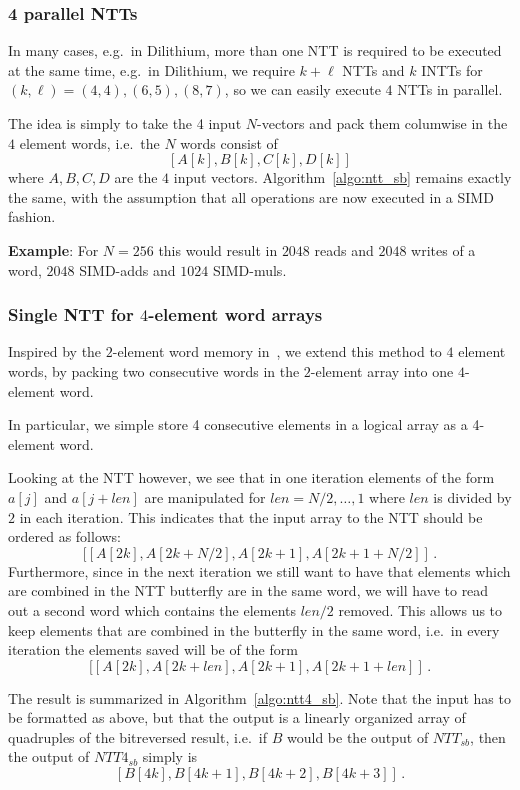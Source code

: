 \subsubsection{4 parallel NTTs}

In many cases, e.g.\ in Dilithium, more than one NTT is required to be executed at the same time, e.g.\
in Dilithium, we require $k + \ell$ NTTs and $k$ INTTs for $(k,\ell) = (4,4), (6,5), (8,7)$, so we can 
easily execute $4$ NTTs in parallel.

The idea is simply to take the 4 input $N$-vectors and pack them columwise in the $4$ element words, i.e.\
the $N$ words consist of 
\[ [A[k], B[k], C[k], D[k]] \]
where $A,B,C,D$ are the $4$ input vectors.    Algorithm~\ref{algo:ntt_sb} remains exactly the same, with the assumption that
all operations are now executed in a SIMD fashion.

\textbf{Example}: For $N = 256$ this would result in $2048$ reads and $2048$ writes of a word, $2048$ SIMD-adds and $1024$ SIMD-muls.

\subsubsection{Single NTT for $4$-element word arrays}

Inspired by the $2$-element word memory in~\cite{}, we extend this method to $4$ element words, by packing 
two consecutive words in the $2$-element array into one $4$-element word.

In particular, we simple store 4 consecutive elements in a logical array as a 4-element word.

Looking at the NTT however, we see that in one iteration elements of the form $a[j]$ and $a[j+len]$
are manipulated for $len = N/2, \ldots, 1$ where $len$ is divided by $2$ in each iteration.  This indicates that
the input array to the NTT should be ordered as follows:
\[ [  [A[2k], A[2k+N/2], A[2k+1], A[2k +1 + N/2]  ] \, . \]
Furthermore, since in the next iteration we still want to have that elements which are combined in 
the NTT butterfly are in the same word, we will have to read out a second word which contains the
elements $len/2$ removed.  This allows us to keep elements that are combined in the butterfly in 
the same word, i.e.\ in every iteration the elements saved will be of the form
\[ [  [A[2k], A[2k+len], A[2k+1], A[2k +1 + len]  ] \, . \]

The result is summarized in Algorithm~\ref{algo:ntt4_sb}.  Note that the input has to be formatted as above, 
but that the output is a linearly organized array of quadruples of the bitreversed result, i.e.\ if 
$B$ would be the output of $NTT_{sb}$, then the output of $NTT4_{sb}$ simply is 
\[ [B[4k], B[4k+1], B[4k+2], B[4k+3]] \, . \]

